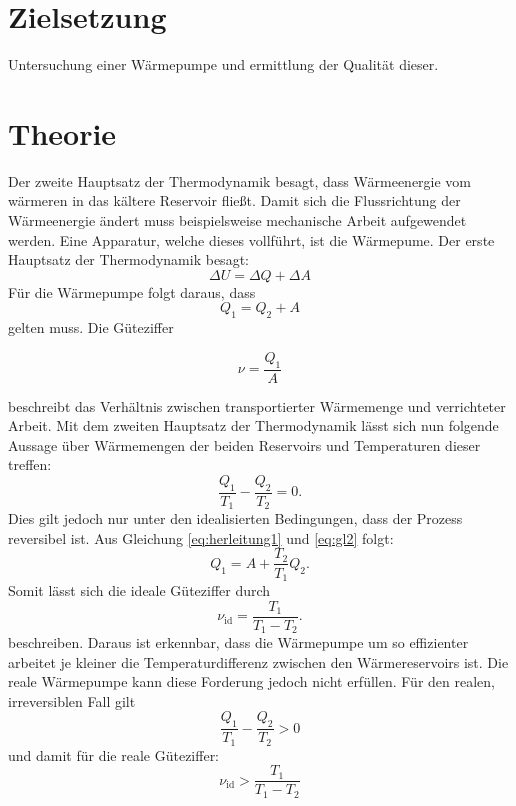 \section{Zielsetzung}
Untersuchung einer Wärmepumpe und ermittlung der Qualität dieser.
\section{Theorie}
\label{sec:Theorie}

Der zweite Hauptsatz der Thermodynamik besagt, dass Wärmeenergie vom wärmeren in das kältere Reservoir fließt.
Damit sich die Flussrichtung der Wärmeenergie ändert muss beispielsweise mechanische Arbeit aufgewendet werden.
Eine Apparatur, welche dieses vollführt, ist die Wärmepume.
Der erste Hauptsatz der Thermodynamik besagt:
\begin{equation}
	\Delta U = \Delta Q + \Delta A
\end{equation}
Für die Wärmepumpe folgt daraus, dass
\begin{equation}
	\label{eq:herleitung1}
	Q_1 = Q_2 + A
\end{equation}
gelten muss.
Die Güteziffer

\begin{equation}
	\label{eq:gl1}
	\nu=\frac{Q_1}{A}
\end{equation}

\noindent beschreibt das Verhältnis zwischen transportierter Wärmemenge und verrichteter Arbeit.
Mit dem zweiten Hauptsatz der Thermodynamik lässt sich nun folgende Aussage über Wärmemengen der beiden Reservoirs und Temperaturen dieser treffen:
\begin{equation}
		\label{eq:gl2}
	\frac{Q_1}{T_1}-\frac{Q_2}{T_2}=0.
\end{equation}
Dies gilt jedoch nur unter den idealisierten Bedingungen, dass der Prozess reversibel ist.
Aus Gleichung \eqref{eq:herleitung1} und \eqref{eq:gl2} folgt:
\begin{equation}
	Q_1 = A + \frac{T_2}{T_1} Q_2 .
\end{equation}
Somit lässt sich die ideale Güteziffer durch
\begin{equation}
	\nu_{\text{id}}=\frac{T_1}{T_1-T_2}.
	\label{eq:guetezifferideal}
\end{equation}
beschreiben.
Daraus ist erkennbar, dass die Wärmepumpe um so effizienter arbeitet je kleiner die Temperaturdifferenz zwischen den Wärmereservoirs ist.
Die reale Wärmepumpe kann diese Forderung jedoch nicht erfüllen.
Für den realen, irreversiblen Fall gilt
\begin{equation}
		\label{eq:gl3}
	\frac{Q_1}{T_1}-\frac{Q_2}{T_2}>0
\end{equation}
und damit für die reale Güteziffer:
\begin{equation}
\nu_{\text{id}} > \frac{T_1}{T_1-T_2}
\end{equation}

